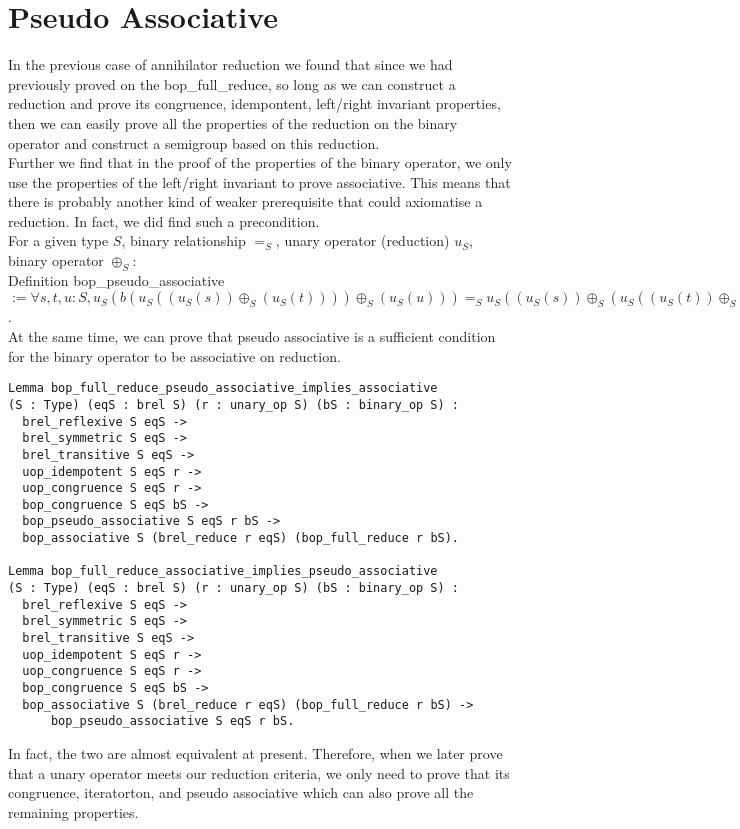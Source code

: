 \documentclass[a4paper,12pt,twoside,openright]{report}
\begin{document}
\section{Pseudo Associative}
In the previous case of annihilator reduction we found that since we had previously proved on the bop\_full\_reduce, so long as we can construct a reduction and prove its congruence, idempontent, left/right invariant properties, then we can easily prove all the properties of the reduction on the binary operator and construct a semigroup based on this reduction.\\
Further we find that in the proof of the properties of the binary operator, we only use the properties of the left/right invariant to prove associative. This means that there is probably another kind of weaker prerequisite that could axiomatise a reduction. In fact, we did find such a precondition.\\
For a given type $S$, binary relationship $=_S$, unary operator (reduction) $u_S$, binary operator $\oplus_S$:\\
Definition bop\_pseudo\_associative $:= \forall s, t, u : S, u_S (b (u_S ((u_S (s)) \oplus_S (u_S (t)))) \oplus_S (u_S (u))) =_S u_S ( (u_S (s)) \oplus_S (u_S ( (u_S (t)) \oplus_S (u_S (u)))))$.\\
At the same time, we can prove that pseudo associative is a sufficient condition for the binary operator to be associative on reduction.
\begin{lstlisting}
Lemma bop_full_reduce_pseudo_associative_implies_associative 
(S : Type) (eqS : brel S) (r : unary_op S) (bS : binary_op S) :
  brel_reflexive S eqS ->
  brel_symmetric S eqS ->  
  brel_transitive S eqS ->   
  uop_idempotent S eqS r ->
  uop_congruence S eqS r ->
  bop_congruence S eqS bS ->
  bop_pseudo_associative S eqS r bS -> 
  bop_associative S (brel_reduce r eqS) (bop_full_reduce r bS). 
         
Lemma bop_full_reduce_associative_implies_pseudo_associative 
(S : Type) (eqS : brel S) (r : unary_op S) (bS : binary_op S) :
  brel_reflexive S eqS ->
  brel_symmetric S eqS ->  
  brel_transitive S eqS ->   
  uop_idempotent S eqS r ->
  uop_congruence S eqS r ->
  bop_congruence S eqS bS ->
  bop_associative S (brel_reduce r eqS) (bop_full_reduce r bS) ->
      bop_pseudo_associative S eqS r bS. 
\end{lstlisting}
In fact, the two are almost equivalent at present.
Therefore, when we later prove that a unary operator meets our reduction criteria, we only need to prove that its congruence, iteratorton, and pseudo associative which can also prove all the remaining properties.
\end{document}
